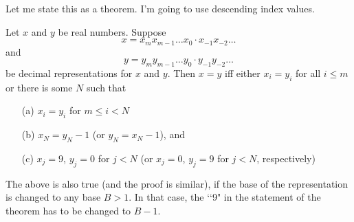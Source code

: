   Let me state this as a theorem.
  I'm going to use descending index values.
  
  \begin{thm}
    Let $x$ and $y$ be real numbers.
    Suppose
    \[
    x = x_m x_{m - 1} \ldots x_0 \cdot x_{-1}x_{-2} \ldots
    \]
    and
    \[
    y = y_m y_{m - 1} \ldots y_0 \cdot y_{-1}y_{-2} \ldots
    \]
    be decimal representations for $x$ and $y$.
    Then $x = y$ iff
    either $x_i = y_i$ for all $i \leq m$ or
    there is some $N$ such that
    \begin{itemize}
    \item[\textnormal{(a)}] $x_i = y_i$ for $m \leq i < N$
    \item[\textnormal{(b)}] $x_N = y_N - 1$ (or $y_N = x_N - 1$),
      and
    \item[\textnormal{(c)}]
      $x_j = 9$, $y_j = 0$ for $j < N$
      (or $x_j = 0$, $y_j = 9$ for $j < N$, respectively)
    \end{itemize}
  \end{thm}

  The above is also true (and the proof is similar), if the base
  of the representation is changed to any base $B > 1$.
  In that case,
  the \lq\lq 9" in the statement of the theorem has to be changed to
  $B - 1$.
  

